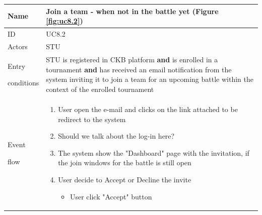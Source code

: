 \begin{center}
    \def\arraystretch{1.5}
    \begin{tabular}{| m{2cm} | m{10cm}|}
        \hline
        Name                  & Join a team - when not in the battle yet (Figure \ref{fig:uc8.2})                                                                                                                                                    \\ \hline
        ID                    & UC8.2                                                                                                                                                                                                                \\ \hline
        Actors                & STU                                                                                                                                                                                                                  \\ \hline
        Entry \par conditions & STU is registered in CKB platform
        \textbf{and} is enrolled in a tournament
        \textbf{and} has received an email notification from the system inviting it to join a team for an upcoming battle within the context of the enrolled tournament                                                                              \\ \hline
        Event \par flow       & \begin{enumerate}
                                    \item User open the e-mail and clicks on the link attached to be redirect to the system
                                    \item {\color{red} Should we talk about the log-in here?}
                                    \item The system show the "Dashboard" page with the invitation, if the join windows for the battle is still open
                                    \item User decide to Accept or Decline the invite
                                          \begin{itemize}
                      \item User click "Accept" button
                  \end{itemize}
                                          \begin{enumerate}

\end{enumerate}
\end{enumerate}
\end{tabular}
\end{center}
